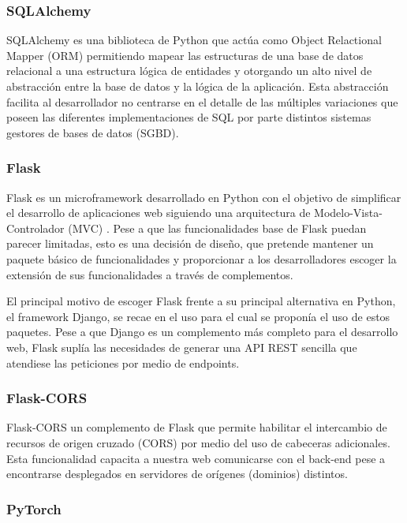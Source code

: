 \subsubsection{SQLAlchemy}

SQLAlchemy \cite{dependencies:sqlalchemy} es una biblioteca de Python que actúa como Object Relactional Mapper (ORM) permitiendo mapear las estructuras de una base de datos relacional a una estructura lógica de entidades y otorgando un alto nivel de abstracción entre la base de datos y la lógica de la aplicación. Esta abstracción facilita al desarrollador no centrarse en el detalle de las múltiples variaciones que poseen las diferentes implementaciones de SQL por parte distintos sistemas gestores de bases de datos (SGBD).

\subsubsection{Flask}

Flask \cite{dependencies:flask} es un microframework desarrollado en Python con el objetivo de simplificar el desarrollo de aplicaciones web siguiendo una arquitectura de Modelo-Vista-Controlador (MVC) \cite{tech:mvc}. Pese a que las funcionalidades base de Flask puedan parecer limitadas, esto es una decisión de diseño, que pretende mantener un paquete básico de funcionalidades y proporcionar a los desarrolladores escoger la extensión de sus funcionalidades a través de complementos.

El principal motivo de escoger Flask frente a su principal alternativa en Python, el framework Django, se recae en el uso para el cual se proponía el uso de estos paquetes. Pese a que Django es un complemento más completo para el desarrollo web, Flask suplía las necesidades de generar una API REST sencilla que atendiese las peticiones por medio de endpoints.

\subsubsection{Flask-CORS}

Flask-CORS \cite{dependencies:flask_cors} un complemento de Flask que permite habilitar el intercambio de recursos de origen cruzado (CORS) por medio del uso de cabeceras adicionales. Esta funcionalidad capacita a nuestra web comunicarse con el back-end pese a encontrarse desplegados en servidores de orígenes (dominios) distintos.

\subsubsection{PyTorch}

